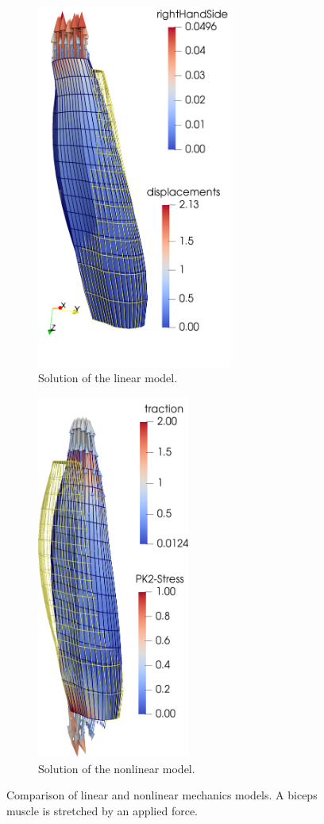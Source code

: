 \begin{figure}
  \centering%
  \hfill
  \begin{subfigure}[t]{0.4\textwidth}%
    \centering%
    \includegraphics[height=12cm]{images/results/basic/lin_nonlin_muscle_mechanics_b.png}%
    \caption{Solution of the linear model.}%
    \label{fig:lin_nonlin_muscle_mechanics_b}%
  \end{subfigure}\hfill
  \begin{subfigure}[t]{0.4\textwidth}%
    \centering%
    \includegraphics[height=12cm]{images/results/basic/lin_nonlin_muscle_mechanics_a.png}%
    \caption{Solution of the nonlinear model.}%
    \label{fig:lin_nonlin_muscle_mechanics_a}%
  \end{subfigure}
  \hfill
  \caption{Comparison of linear and nonlinear mechanics models. A biceps muscle is stretched by an applied force.}%
  \label{fig:lin_nonlin_muscle_mechanics}%
\end{figure}%

